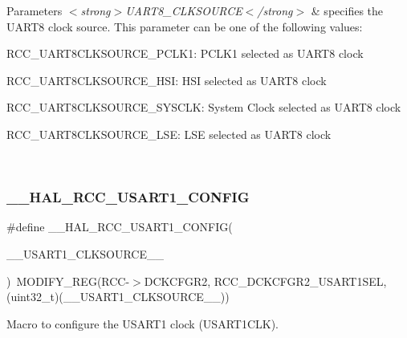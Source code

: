 \begin{DoxyParams}{Parameters}
{\em $<$strong$>$\+U\+A\+R\+T8\+\_\+\+C\+L\+K\+S\+O\+U\+R\+C\+E$<$/strong$>$} & specifies the U\+A\+R\+T8 clock source. This parameter can be one of the following values\+: \begin{DoxyItemize}
\item R\+C\+C\+\_\+\+U\+A\+R\+T8\+C\+L\+K\+S\+O\+U\+R\+C\+E\+\_\+\+P\+C\+L\+K1\+: P\+C\+L\+K1 selected as U\+A\+R\+T8 clock \item R\+C\+C\+\_\+\+U\+A\+R\+T8\+C\+L\+K\+S\+O\+U\+R\+C\+E\+\_\+\+H\+SI\+: H\+SI selected as U\+A\+R\+T8 clock \item R\+C\+C\+\_\+\+U\+A\+R\+T8\+C\+L\+K\+S\+O\+U\+R\+C\+E\+\_\+\+S\+Y\+S\+C\+LK\+: System Clock selected as U\+A\+R\+T8 clock \item R\+C\+C\+\_\+\+U\+A\+R\+T8\+C\+L\+K\+S\+O\+U\+R\+C\+E\+\_\+\+L\+SE\+: L\+SE selected as U\+A\+R\+T8 clock \end{DoxyItemize}
\\
\hline
\end{DoxyParams}
\mbox{\label{group___r_c_c_ex___exported___macros_ga4a383ccb3cc3caaea1f4226e3e61f3e0}} 
\subsubsection{\texorpdfstring{\_\_HAL\_RCC\_USART1\_CONFIG}{\_\_HAL\_RCC\_USART1\_CONFIG}}
{\footnotesize\ttfamily \#define \+\_\+\+\_\+\+H\+A\+L\+\_\+\+R\+C\+C\+\_\+\+U\+S\+A\+R\+T1\+\_\+\+C\+O\+N\+F\+IG(\begin{DoxyParamCaption}\item[{}]{\+\_\+\+\_\+\+U\+S\+A\+R\+T1\+\_\+\+C\+L\+K\+S\+O\+U\+R\+C\+E\+\_\+\+\_\+ }\end{DoxyParamCaption})~M\+O\+D\+I\+F\+Y\+\_\+\+R\+EG(R\+CC-\/$>$D\+C\+K\+C\+F\+G\+R2, R\+C\+C\+\_\+\+D\+C\+K\+C\+F\+G\+R2\+\_\+\+U\+S\+A\+R\+T1\+S\+EL, (uint32\+\_\+t)(\+\_\+\+\_\+\+U\+S\+A\+R\+T1\+\_\+\+C\+L\+K\+S\+O\+U\+R\+C\+E\+\_\+\+\_\+))}



Macro to configure the U\+S\+A\+R\+T1 clock (U\+S\+A\+R\+T1\+C\+LK). 


